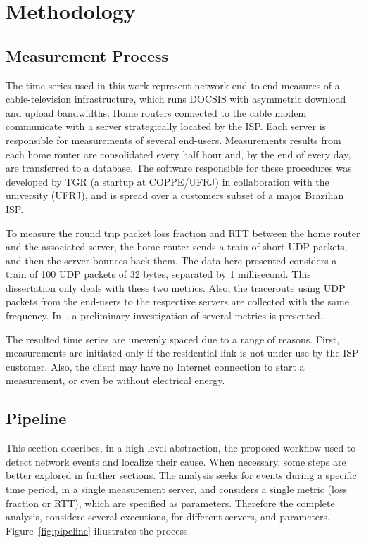\chapter{Methodology}
\label{chap:methodology}

\section{Measurement Process}

The time series used in this work represent network end-to-end measures of a
cable-television infrastructure, which runs DOCSIS with asymmetric download and
upload bandwidths. Home routers connected to the cable modem communicate with
a server strategically located by the ISP\@.
Each server is responsible for measurements of several end-users.
Measurements results from
each home router are consolidated every half hour and, by the end of every day,
are transferred to a database. The software responsible for these procedures was
developed by TGR (a startup at COPPE/UFRJ) in collaboration with the university
(UFRJ), and is spread over a customers subset of a major Brazilian ISP\@.

To measure the
round
trip packet loss fraction and RTT between the home router and the associated
server, the
home router sends a train of short UDP packets, and then the server bounces back
them. The data here presented considers a train of 100 UDP packets of 32 bytes,
separated by 1 millisecond. This dissertation only deals with these two
metrics. Also, the traceroute using UDP packets from the end-users to
the respective servers are collected with the same frequency.
In~\cite{a_preliminary_performance_measurement_study_of_residential_broadband_services_in_brazil},
a preliminary investigation of several metrics is presented.

The resulted time series are unevenly spaced due to a range of reasons. First,
measurements are initiated only if the residential link is not under use by the
ISP customer. Also, the client may have no Internet connection to start a
measurement, or even be without electrical energy.

\section{Pipeline}

This section describes, in a high level abstraction, the proposed workflow
used to detect network events and localize their cause. When necessary, some
steps are better explored in further sections.
The analysis seeks for events during a specific time period, in a single
measurement server, and considers a
single metric (loss fraction or RTT), which are specified as parameters.
Therefore the complete analysis, considere several executions, for different
servers, and parameters.
Figure~\ref{fig:pipeline} illustrates the process.

